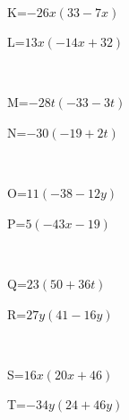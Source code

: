 \documentclass{article}%
\begin{document}
\\%
\begin{minipage}{0.5\textwidth}%
K=$-26x(33-7x)$\\%
\end{minipage}%
\begin{minipage}{0.5\textwidth}%
L=$13x(-14x+32)$\\%
\end{minipage}%
\\%
\begin{minipage}{0.5\textwidth}%
M=$-28t(-33-3t)$\\%
\end{minipage}%
\begin{minipage}{0.5\textwidth}%
N=$-30(-19+2t)$\\%
\end{minipage}%
\\%
\begin{minipage}{0.5\textwidth}%
O=$11(-38-12y)$\\%
\end{minipage}%
\begin{minipage}{0.5\textwidth}%
P=$5(-43x-19)$\\%
\end{minipage}%
\\%
\begin{minipage}{0.5\textwidth}%
Q=$23(50+36t)$\\%
\end{minipage}%
\begin{minipage}{0.5\textwidth}%
R=$27y(41-16y)$\\%
\end{minipage}%
\\%
\begin{minipage}{0.5\textwidth}%
S=$16x(20x+46)$\\%
\end{minipage}%
\begin{minipage}{0.5\textwidth}%
T=$-34y(24+46y)$\\%
\end{minipage}%
\\

%
\newpage%
\end{document}
